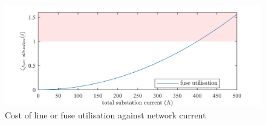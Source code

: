 \begin{figure}\centering
	\includegraphics{_chapter1/fig/fuse-utilisation}
	\caption{Cost of line or fuse utilisation against network current}
	\label{ch1:fig:fuse-utilisation}
\end{figure}